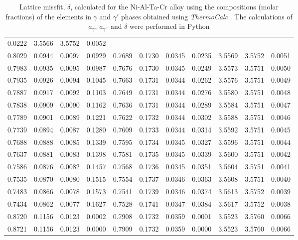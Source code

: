 \begin{table}[H]
\begin{tabular}{rrrrrrrrrrr}
0.0222 & 3.5566 & 3.5752 & 0.0052 \\0.8029 & 0.0944 & 0.0097 & 0.0929 & 0.7689 & 0.1730 & 0.0345 & 0.0235 & 3.5569 & 3.5752 & 0.0051 \\0.7983 & 0.0935 & 0.0095 & 0.0987 & 0.7676 & 0.1730 & 0.0345 & 0.0249 & 3.5573 & 3.5751 & 0.0050 \\0.7935 & 0.0926 & 0.0094 & 0.1045 & 0.7663 & 0.1731 & 0.0344 & 0.0262 & 3.5576 & 3.5751 & 0.0049 \\0.7887 & 0.0917 & 0.0092 & 0.1103 & 0.7649 & 0.1731 & 0.0344 & 0.0276 & 3.5580 & 3.5751 & 0.0048 \\0.7838 & 0.0909 & 0.0090 & 0.1162 & 0.7636 & 0.1731 & 0.0344 & 0.0289 & 3.5584 & 3.5751 & 0.0047 \\0.7789 & 0.0901 & 0.0089 & 0.1221 & 0.7622 & 0.1732 & 0.0344 & 0.0302 & 3.5588 & 3.5751 & 0.0046 \\0.7739 & 0.0894 & 0.0087 & 0.1280 & 0.7609 & 0.1733 & 0.0344 & 0.0314 & 3.5592 & 3.5751 & 0.0045 \\0.7688 & 0.0888 & 0.0085 & 0.1339 & 0.7595 & 0.1734 & 0.0345 & 0.0327 & 3.5596 & 3.5751 & 0.0044 \\0.7637 & 0.0881 & 0.0083 & 0.1398 & 0.7581 & 0.1735 & 0.0345 & 0.0339 & 3.5600 & 3.5751 & 0.0042 \\0.7586 & 0.0876 & 0.0082 & 0.1457 & 0.7568 & 0.1736 & 0.0345 & 0.0351 & 3.5604 & 3.5751 & 0.0041 \\0.7535 & 0.0870 & 0.0080 & 0.1515 & 0.7554 & 0.1737 & 0.0346 & 0.0363 & 3.5608 & 3.5751 & 0.0040 \\0.7483 & 0.0866 & 0.0078 & 0.1573 & 0.7541 & 0.1739 & 0.0346 & 0.0374 & 3.5613 & 3.5752 & 0.0039 \\0.7434 & 0.0862 & 0.0077 & 0.1627 & 0.7528 & 0.1741 & 0.0347 & 0.0384 & 3.5617 & 3.5752 & 0.0038 \\0.8720 & 0.1156 & 0.0123 & 0.0002 & 0.7908 & 0.1732 & 0.0359 & 0.0001 & 3.5523 & 3.5760 & 0.0066 \\0.8721 & 0.1156 & 0.0123 & 0.0000 & 0.7909 & 0.1732 & 0.0359 & 0.0000 & 3.5523 & 3.5760 & 0.0066
    \end{tabular}
    \caption{Lattice missfit, $\delta$, calculated for the Ni-Al-Ta-Cr alloy using the compositions (molar fractions) of the elements in $\gamma$ and $\gamma'$ phases obtained using \textit{ThermoCalc} \citep{thermocalc}. The calculations of $a_\gamma$, $a_{\gamma´}$ and $\delta$ were performed in Python \citep{mygit}}
    \label{tab:tab04}
\end{table}


